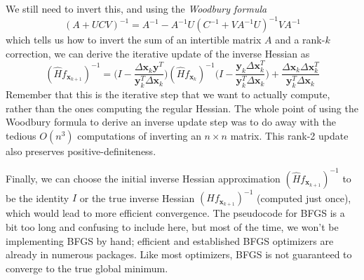   We still need to invert this, and using the \textit{Woodbury formula}
  \[(A + U C V)^{-1} = A^{-1} - A^{-1} U (C^{-1} + V A^{-1} U)^{-1} V A^{-1}\]
  which tells us how to invert the sum of an intertible matrix $A$ and a rank-$k$ correction, we can derive the iterative update of the inverse Hessian as 
  \[(\hat{H} f_{\mathbf{x}_{k+1}})^{-1} = \bigg( I - \frac{\Delta \mathbf{x}_k \mathbf{y}^T}{\mathbf{y}_k^T \Delta \mathbf{x}_k}\bigg) (\hat{H} f_{\mathbf{x}_{k}})^{-1} \bigg( I - \frac{\mathbf{y}_k \Delta \mathbf{x}_k^T}{\mathbf{y}_k^T \Delta \mathbf{x}_k}\bigg) + \frac{\Delta \mathbf{x}_k \Delta \mathbf{x}_k^T}{\mathbf{y}_k^T \Delta \mathbf{x}_k}\]
  Remember that this is the iterative step that we want to actually compute, rather than the ones computing the regular Hessian. The whole point of using the Woodbury formula to derive an inverse update step was to do away with the tedious $O(n^3)$ computations of inverting an $n \times n$ matrix. This rank-2 update also preserves positive-definiteness. 

  Finally, we can choose the initial inverse Hessian approximation $(\hat{H} f_{\mathbf{x}_{k+1}})^{-1}$ to be the identity $I$ or the true inverse Hessian $(H f_{\mathbf{x}_{k+1}})^{-1}$ (computed just once), which would lead to more efficient convergence. The pseudocode for BFGS is a bit too long and confusing to include here, but most of the time, we won't be implementing BFGS by hand; efficient and established BFGS optimizers are already in numerous packages. Like most optimizers, BFGS is not guaranteed to converge to the true global minimum. 

